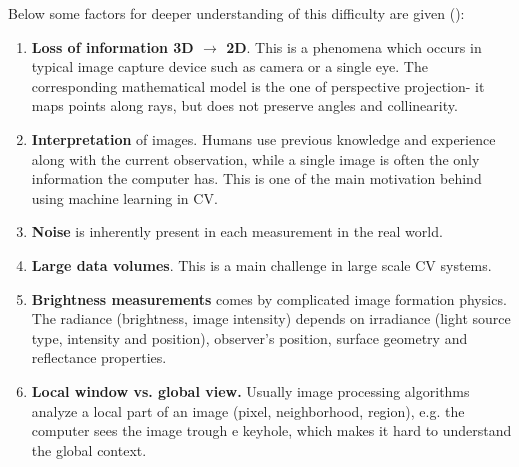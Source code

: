 Below some factors for deeper understanding of this difficulty are given (\cite{Sonka99}):

\begin{enumerate}
\item {\bf Loss of information 3D $\rightarrow$ 2D}. This is a phenomena which occurs in typical image capture device such as camera or a single eye. The corresponding mathematical model is the one of perspective projection- it maps points along rays, but does not preserve angles and collinearity.
\item {\bf Interpretation} of images. Humans use previous knowledge and experience along with the current observation, while a single image is often the only information the computer has. This is one of the  main motivation behind using machine learning in CV.
\item {\bf Noise} is inherently present in each measurement in the real world. 
\item {\bf Large data volumes}. This is a main challenge in large scale CV systems.
\item {\bf Brightness measurements} comes by complicated image formation physics. The radiance (brightness, image intensity) depends on irradiance (light source type, intensity and position), observer's position, surface geometry and reflectance properties.
\item {\bf Local window vs. global view.} Usually image processing algorithms analyze a local part of an image (pixel, neighborhood, region), e.g. the computer sees the image trough e keyhole, which makes it hard to understand the global context.
\end{enumerate}
 
